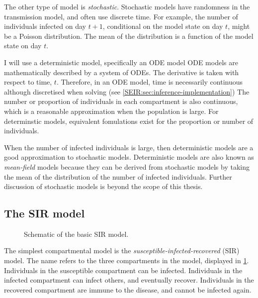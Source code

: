 \documentclass[thesis.tex]{subfiles}
\begin{document}
The other type of model is \emph{stochastic}.
Stochastic models have randomness in the transmission model, and often use discrete time.
For example, the number of individuals infected on day $t+1$, conditional on the model state on day $t$, might be a Poisson distribution.
The mean of the distribution is a function of the model state on day $t$.

I will use a deterministic model, specifically an ODE model
ODE models are mathematically described by a system of ODEs.
The derivative is taken with respect to time, $t$.
Therefore, in an ODE model, time is necessarily continuous although discretised when solving (see \cref{SEIR:sec:inference-implementation})
The number or proportion of individuals in each compartment is also continuous, which is a reasonable approximation when the population is large.
For determinstic models, equivalent fomulations exist for the proportion or number of individuals.

When the number of infected individuals is large, then deterministic models are a good approximation to stochastic models.
Deterministic models are also known as \emph{mean-field} models because they can be derived from stochastic models by taking the mean of the distribution of the number of infected individuals.
Further discussion of stochastic models is beyond the scope of this thesis.


\subsection{The SIR model}
\begin{figure}[h]
  \caption[The SIR model]{Schematic of the basic SIR model.}
  \label{SEIR:fig:SIR}
\end{figure}

The simplest compartmental model is the \emph{susceptible-infected-recovered} (SIR) model.
The name refers to the three compartments in the model, displayed in \cref{SEIR:fig:SIR}.
Individuals in the susceptible compartment can be infected.
Individuals in the infected compartment can infect others, and eventually recover.
Individuals in the recovered compartment are immune to the disease, and cannot be infected again.
\end{document}
